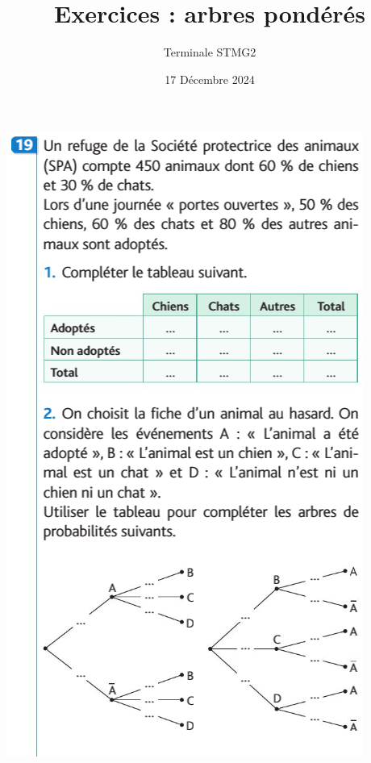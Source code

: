 \documentclass{article}
\title{Exercices : arbres pondérés}
\author{Terminale STMG2}
\date{17 Décembre 2024}
\begin{document}
\maketitle

\begin{center}
\begin{minipage}{0.45\textwidth}
\includegraphics[width=\textwidth]{Exercice_1.png}    
\end{minipage}
\hfill
\begin{minipage}{0.45\textwidth}

\end{minipage}
\end{center}
\end{document}
